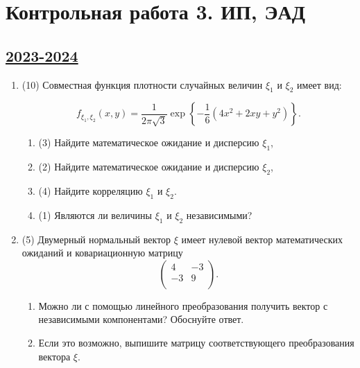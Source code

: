 \newpage
\thispagestyle{empty}
\section{Контрольная работа 3. ИП, ЭАД}


\subsection[2023-2024]{\hyperref[sec:sol_kr_03_ip_2023_2024]{2023-2024}}
\label{sec:kr_03_ip_2023_2024}


\begin{enumerate}
\item  (10)  Совместная функция плотности случайных величин $\xi_1$ и $\xi_2$ имеет вид:

\[
  f_{\xi_1, \xi_2} (x, y) = \frac{1}{2\pi\sqrt 3} \exp\left\{-\frac{1}{6}(4x^2 + 2xy + y^2)\right\}.
\]
\begin{enumerate}
\item  (3) Найдите математическое ожидание и дисперсию $\xi_1$,
\item  (2) Найдите математическое ожидание и дисперсию $\xi_2$,
\item  (4) Найдите корреляцию $\xi_1$ и $\xi_2$. 
\item  (1) Являются ли величины $\xi_1$ и $\xi_2$ независимыми?
\end{enumerate}

\item (5) Двумерный нормальный вектор $\xi$ имеет нулевой вектор математических ожиданий 
и ковариационную матрицу 
\[
  \begin{pmatrix}
    4 & -3 \\
    -3 & 9 \\
  \end{pmatrix}.
\]
\begin{enumerate}
  \item Можно ли с помощью линейного преобразования получить вектор с независимыми компонентами? Обоснуйте ответ.
  \item Если это возможно, выпишите матрицу соответствующего преобразования вектора $\xi$.
\end{enumerate}



\end{enumerate}
